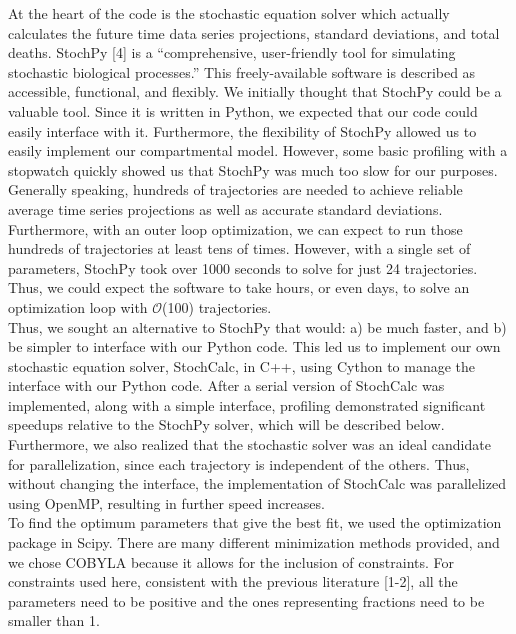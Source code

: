 \documentclass[11pt,letter]{article}
\begin{document}
At the heart of the code is the stochastic equation solver which actually calculates the future time data series projections, standard deviations, and total deaths. StochPy [4] is a ``comprehensive, user-friendly tool for simulating stochastic biological processes.'' This freely-available software is described as accessible, functional, and flexibly. We initially thought that StochPy could be a valuable tool. Since it is written in Python, we expected that our code could easily interface with it. Furthermore, the flexibility of StochPy allowed us to easily implement our compartmental model. However, some basic profiling with a stopwatch quickly showed us that StochPy was much too slow for our purposes. Generally speaking, hundreds of trajectories are needed to achieve reliable average time series projections as well as accurate standard deviations. Furthermore, with an outer loop optimization, we can expect to run those hundreds of trajectories at least tens of times. However, with a single set of parameters, StochPy took over 1000 seconds to solve for just 24 trajectories. Thus, we could expect the software to take hours, or even days, to solve an optimization loop with $\mathcal{O}$(100) trajectories.\\

Thus, we sought an alternative to StochPy that would: a) be much faster, and b) be simpler to interface with our Python code. This led us to implement our own stochastic equation solver, StochCalc, in C++, using Cython to manage the interface with our Python code. After a serial version of StochCalc was implemented, along with a simple interface, profiling demonstrated significant speedups relative to the StochPy solver, which will be described below. Furthermore, we also realized that the stochastic solver was an ideal candidate for parallelization, since each trajectory is independent of the others. Thus, without changing the interface, the implementation of StochCalc was parallelized using OpenMP, resulting in further speed increases.\\

To find the optimum parameters that give the best fit, we used the optimization package in Scipy. There are many different minimization methods provided, and we chose COBYLA because it allows for the inclusion of constraints. For constraints used here, consistent with the previous literature [1-2], all the parameters need to be positive and the ones representing fractions need to be smaller than 1. \\
\end{document}
